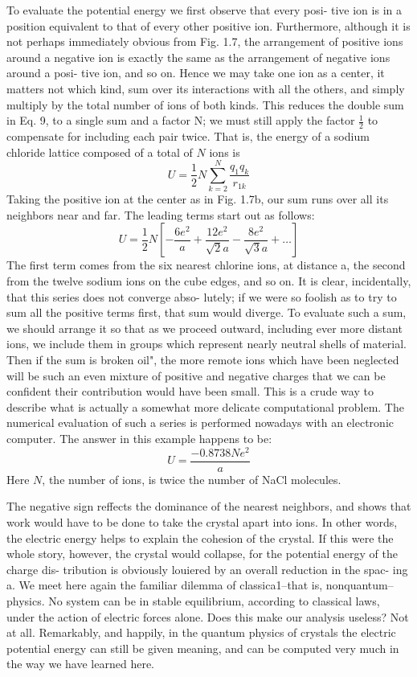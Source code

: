 To evaluate the potential energy we first observe that every posi-
tive ion is in a position equivalent to that of every other positive ion.
Furthermore, although it is not perhaps immediately obvious from
Fig. 1.7, the arrangement of positive ions around a negative ion is
exactly the same as the arrangement of negative ions around a posi-
tive ion, and so on. Hence we may take one ion as a center, it matters
not which kind, sum over its interactions with all the others, and
simply multiply by the total number of ions of both kinds. This
reduces the double sum in Eq. 9, to a single sum and a factor N; we
must still apply the factor $\frac{1}{2}$ to compensate for including each pair
twice. That is, the energy of a sodium chloride lattice composed of
a total of $N$ ions is
\begin{equation}
  U = \frac{1}{2} N \sum_{k=2}^N \frac{q_1q_k}{r_{1k}}
\end{equation}
Taking the positive ion at the center as in Fig. 1.7b, our sum runs
over all its neighbors near and far. The leading terms start out as
follows:
\begin{equation}
  U = \frac{1}{2} N \left[-\frac{6e^2}{a}+\frac{12e^2}{\sqrt{2}a}-\frac{8e^2}{\sqrt{3}a}+\ldots\right]
\end{equation}
The first term comes from the six nearest chlorine ions, at distance
a, the second from the twelve sodium ions on the cube edges, and so
on. It is clear, incidentally, that this series does not converge abso-
lutely; if we were so foolish as to try to sum all the positive terms
first, that sum would diverge. To evaluate such a sum, we should
arrange it so that as we proceed outward, including ever more distant
ions, we include them in groups which represent nearly neutral shells
of material. Then if the sum is broken oil", the more remote ions
which have been neglected will be such an even mixture of positive
and negative charges that we can be confident their contribution
would have been small. This is a crude way to describe what is
actually a somewhat more delicate computational problem. The
numerical evaluation of such a series is performed nowadays with an
electronic computer. The answer in this example happens to be:
\begin{equation}
  U = \frac{-0.8738Ne^2}{a}
\end{equation}
Here $N$, the number of ions, is twice the number of NaCl molecules.

The negative sign reffects the dominance of the nearest neighbors,
and shows that work would have to be done to take the crystal apart
into ions. In other words, the electric energy helps to explain the
cohesion of the crystal. If this were the whole story, however, the
crystal would collapse, for the potential energy of the charge dis-
tribution is obviously louiered by an overall reduction in the spac-
ing a. We meet here again the familiar dilemma of classica1--that
is, nonquantum--physics. No system can be in stable equilibrium,
according to classical laws, under the action of electric forces alone.
Does this make our analysis useless? Not at all. Remarkably, and
happily, in the quantum physics of crystals the electric potential
energy can still be given meaning, and can be computed very much
in the way we have learned here.

